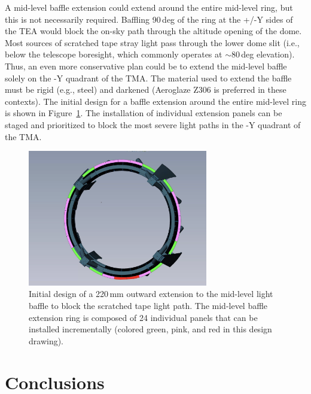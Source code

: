 \documentclass[SE,authoryear,toc]{lsstdoc}
\begin{document}
A mid-level baffle extension could extend around the entire mid-level ring, but this is not necessarily required. Baffling 90\,deg of the ring at the +/-Y sides of the TEA would block the on-sky path through the altitude opening of the dome. Most sources of scratched tape stray light pass through the lower dome slit (i.e., below the telescope boresight, which commonly operates at $\sim$80\,deg elevation). Thus, an even more conservative plan could be to extend the mid-level baffle solely on the -Y quadrant of the TMA. The material used to extend the baffle must be rigid (e.g., steel) and darkened (Aeroglaze Z306 is preferred in these contexts). %
The initial design for a baffle extension around the entire mid-level ring is shown in Figure~\ref{fig:baffle}.
The installation of individual extension panels can be staged and prioritized to block the most severe light paths in the -Y quadrant of the TMA.

\begin{figure}[!t]
    \centering
    \includegraphics[width=0.7\textwidth, trim={2cm 0cm 0cm 0cm}, clip]{figures/baffle-ring.png}
    \caption{\label{fig:baffle} Initial design of a 220\,mm outward extension to the mid-level light baffle to block the scratched tape light path. The mid-level baffle extension ring is composed of 24 individual panels that can be installed incrementally (colored green, pink, and red in this design drawing).}
\end{figure}

\section{Conclusions}
\label{sec:conclusions}
\end{document}
